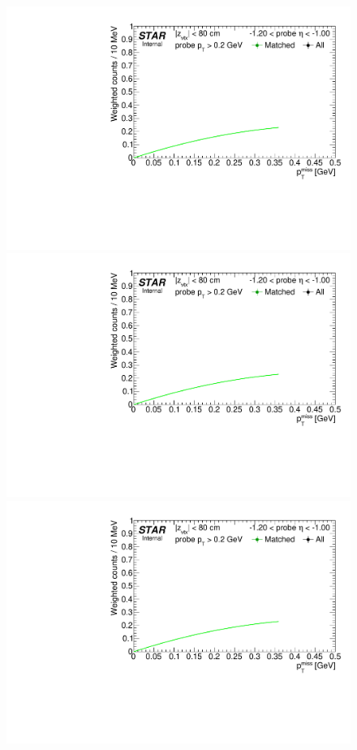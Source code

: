 \begin{figure}[ht]\ContinuedFloat
\centering
\parbox{0.495\textwidth}{
  \centering
  
  \includegraphics[width=\linewidth,page=6]{graphics/systematicsEfficiency/TOF_tagAndProbe/Fitting_effVsEta_data.CPT.pdf}\\
  \includegraphics[width=\linewidth,page=7]{graphics/systematicsEfficiency/TOF_tagAndProbe/Fitting_effVsEta_data.CPT.pdf}\\
  \includegraphics[width=\linewidth,page=8]{graphics/systematicsEfficiency/TOF_tagAndProbe/Fitting_effVsEta_data.CPT.pdf}\\
}
\end{figure}
